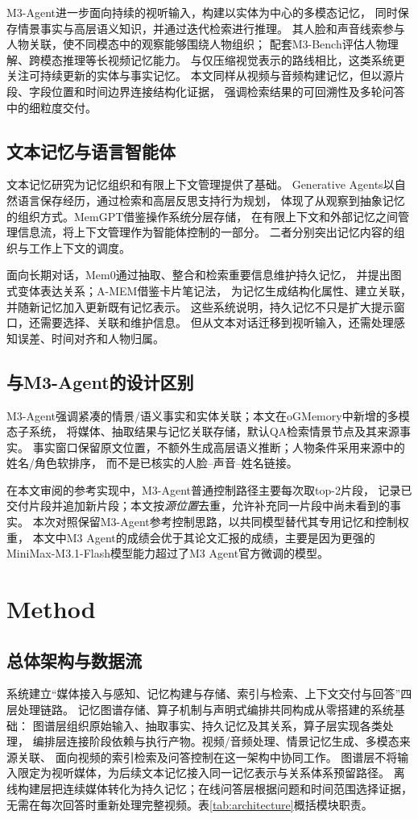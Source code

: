 \documentclass[UTF8,a4paper,11pt,fontset=fandol]{ctexart}
\newcommand*{\memoryprojectname}{oGMemory}
\begin{document}
M3-Agent\cite{m3agent}进一步面向持续的视听输入，构建以实体为中心的多模态记忆，
同时保存情景事实与高层语义知识，并通过迭代检索进行推理。
其人脸和声音线索参与人物关联，使不同模态中的观察能够围绕人物组织；
配套M3-Bench评估人物理解、跨模态推理等长视频记忆能力。
与仅压缩视觉表示的路线相比，这类系统更关注可持续更新的实体与事实记忆。
本文同样从视频与音频构建记忆，但以源片段、字段位置和时间边界连接结构化证据，
强调检索结果的可回溯性及多轮问答中的细粒度交付。

\subsection{文本记忆与语言智能体}
文本记忆研究为记忆组织和有限上下文管理提供了基础。
Generative Agents\cite{generative}以自然语言保存经历，通过检索和高层反思支持行为规划，
体现了从观察到抽象记忆的组织方式。MemGPT\cite{memgpt}借鉴操作系统分层存储，
在有限上下文和外部记忆之间管理信息流，将上下文管理作为智能体控制的一部分。
二者分别突出记忆内容的组织与工作上下文的调度。

面向长期对话，Mem0\cite{mem0}通过抽取、整合和检索重要信息维护持久记忆，
并提出图式变体表达关系；A-MEM\cite{amem}借鉴卡片笔记法，
为记忆生成结构化属性、建立关联，并随新记忆加入更新既有记忆表示。
这些系统说明，持久记忆不只是扩大提示窗口，还需要选择、关联和维护信息。
但从文本对话迁移到视听输入，还需处理感知误差、时间对齐和人物归属。

\subsection{与M3-Agent的设计区别}
M3-Agent强调紧凑的情景/语义事实和实体关联；本文在\memoryprojectname{}中新增的多模态子系统，
将媒体、抽取结果与记忆关联存储，默认QA检索情景节点及其来源事实。
事实窗口保留原文位置，不额外生成高层语义推断；人物条件采用来源中的姓名/角色软排序，
而不是已核实的人脸--声音--姓名链接。

在本文审阅的参考实现中，M3-Agent普通控制路径主要每次取top-2片段，
记录已交付片段并追加新片段；本文按\emph{源位置}去重，允许补充同一片段中尚未看到的事实。
本次对照保留M3-Agent参考控制思路，以共同模型替代其专用记忆和控制权重，
本文中M3 Agent的成绩会优于其论文汇报的成绩，主要是因为更强的MiniMax-M3.1-Flash模型能力超过了M3 Agent官方微调的模型。

\section{Method}
\subsection{总体架构与数据流}
系统建立“媒体接入与感知、记忆构建与存储、索引与检索、上下文交付与回答”四层处理链路。
记忆图谱存储、算子机制与声明式编排共同构成从零搭建的系统基础：
图谱层组织原始输入、抽取事实、持久记忆及其关系，算子层实现各类处理，
编排层连接阶段依赖与执行产物。视频/音频处理、情景记忆生成、多模态来源关联、
面向视频的索引检索及问答控制在这一架构中协同工作。
图谱层不将输入限定为视听媒体，为后续文本记忆接入同一记忆表示与关系体系预留路径。
离线构建层把连续媒体转化为持久记忆；在线问答层根据问题和时间范围选择证据，
无需在每次回答时重新处理完整视频。表\ref{tab:architecture}概括模块职责。
\end{document}
